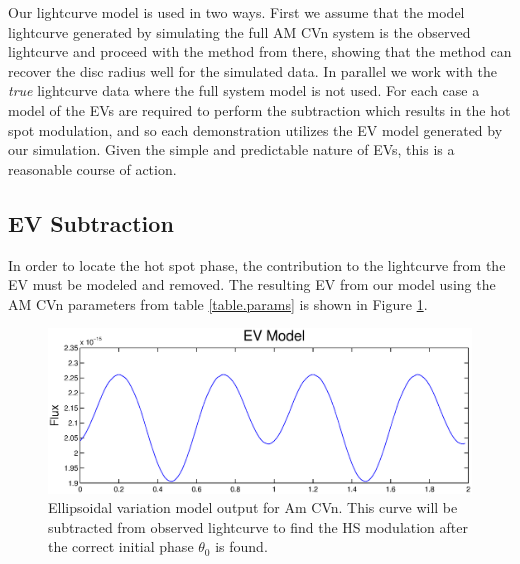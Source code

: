 \documentclass[preprint2]{aastex}
\newcommand{\note}[1]{[$\blacktriangleright$~\textbf{#1}~$\blacktriangleleft$]}
\begin{document}
Our lightcurve model is used in two ways. First we assume that the model lightcurve generated by simulating the full AM CVn system is the observed lightcurve and proceed with the method from there, showing that the method can recover the disc radius well for the simulated data. In parallel we work with the \textit{true} lightcurve data where the full system model is not used. For each case a model of the EVs are required to perform the subtraction which results in the hot spot modulation, and so each demonstration utilizes the EV model generated by our simulation. Given the simple and predictable nature of EVs, this is a reasonable course of action.



\subsection{EV Subtraction}

In order to locate the hot spot phase, the contribution to the 
lightcurve from the EV must be modeled and removed. The 
resulting EV from our model using the AM CVn parameters from table \ref{table.params} is shown in Figure \ref{fig.EV}.

\begin{figure}[h!]
\centering
\includegraphics[width=\columnwidth]{./EV.eps}
\caption{Ellipsoidal variation model output for Am CVn. This curve will be subtracted from
observed lightcurve to find the HS modulation after the correct initial phase $\theta_0$ is found.}
\label{fig.EV}
\end{figure}
\end{document}
